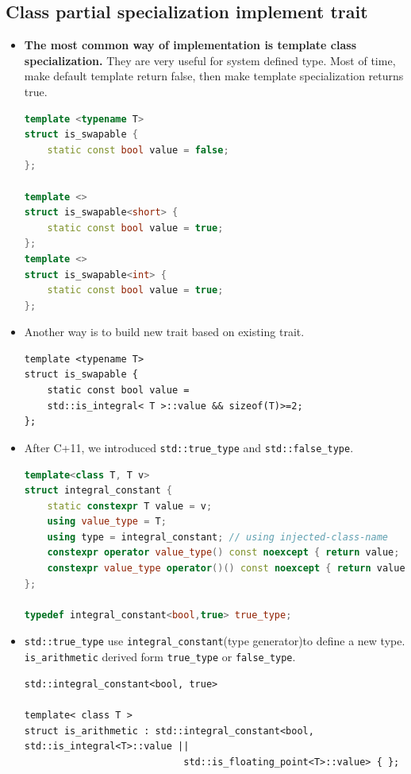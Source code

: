 \documentclass[a4paper,11pt,twoside]{book}
\begin{document}
\subsection{Class partial specialization implement trait}
\begin{itemize}
	
	\item \textbf{The most common way of implementation is template class specialization.} They are very useful for system defined type. Most of time, make default template return false, then make template specialization returns true. 
\begin{lstlisting}[frame=single, language=c++]
template <typename T>
struct is_swapable {
	static const bool value = false;
};

template <>
struct is_swapable<short> {
	static const bool value = true;
};
template <>
struct is_swapable<int> {
	static const bool value = true;
};
\end{lstlisting}

\item Another way is to build new trait based on existing trait.
\begin{lstlisting}[numbers=none]
template <typename T>
struct is_swapable {
	static const bool value = 
	std::is_integral< T >::value && sizeof(T)>=2;
};
\end{lstlisting}

	\item After C+11, we introduced \texttt{std::true\_type} and \texttt{std::false\_type}.
\begin{lstlisting}[frame=single, language=c++]
template<class T, T v>
struct integral_constant {
	static constexpr T value = v;
	using value_type = T;
	using type = integral_constant; // using injected-class-name
	constexpr operator value_type() const noexcept { return value; }
	constexpr value_type operator()() const noexcept { return value; } //since c++14
};
	
typedef integral_constant<bool,true> true_type;
\end{lstlisting}


\item \texttt{std::true\_type} use \texttt{integral\_constant}(type generator)to define a new type. \newline 
\texttt{is\_arithmetic} derived form \texttt{true\_type} or \texttt{false\_type}.
\begin{lstlisting}[numbers=none]
std::integral_constant<bool, true>

template< class T >
struct is_arithmetic : std::integral_constant<bool, std::is_integral<T>::value ||
							std::is_floating_point<T>::value> { };
\end{lstlisting}


\end{itemize}
\end{document}
